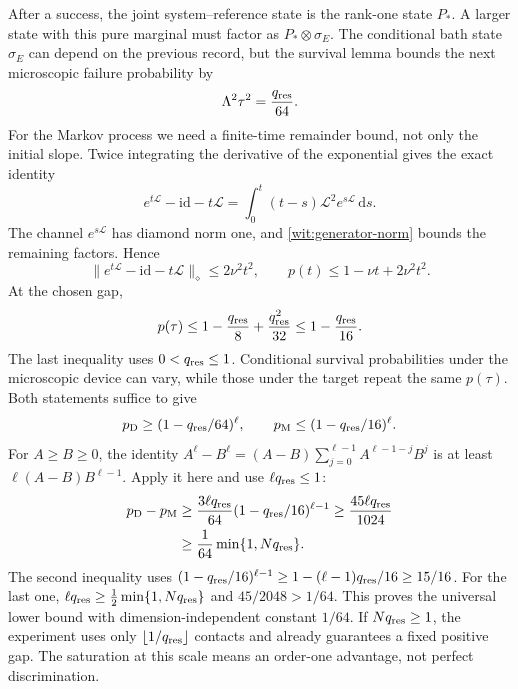 \documentclass[11pt,a4paper]{article}
\numberwithin{equation}{section}
\theoremstyle{remark}
\newcommand{\dd}{\mathrm d}
\begin{document}
After a success, the joint system--reference state is the rank-one
state $P_*$. A larger state with this pure marginal must factor as
$P_*\otimes\sigma_E$. The conditional bath state $\sigma_E$ can depend
on the previous record, but the survival lemma bounds the next
microscopic failure probability by
\begin{equation}
 \Lambda^2\tau^2=\frac{q_{\rm res}}{64}.
\end{equation}
For the Markov process we need a finite-time remainder bound, not only
the initial slope. Twice integrating the derivative of the exponential
gives the exact identity
\begin{equation}
 e^{t\mathcal L}-\mathrm{id}-t\mathcal L
 =\int_0^t(t-s)\mathcal L^2e^{s\mathcal L}\,\dd s.
\end{equation}
The channel $e^{s\mathcal L}$ has diamond norm one, and
\eqref{wit:generator-norm} bounds the remaining factors. Hence
\begin{equation}
 \|e^{t\mathcal L}-\mathrm{id}-t\mathcal L\|_\diamond
 \leq2\nu^2t^2,
 \qquad
 p(t)\leq1-\nu t+2\nu^2t^2.
 \label{wit:taylor-bound}
\end{equation}
At the chosen gap,
\begin{equation}
 p(\tau)\leq1-\frac{q_{\rm res}}8+\frac{q_{\rm res}^2}{32}
 \leq1-\frac{q_{\rm res}}{16}.
\end{equation}
The last inequality uses $0<q_{\rm res}\leq1$. Conditional survival probabilities
under the microscopic device can vary, while those under the target
repeat the same $p(\tau)$. Both statements suffice to give
\begin{equation}
 p_{\mathrm D}\geq(1-q_{\rm res}/64)^\ell,
 \qquad p_{\mathrm M}\leq(1-q_{\rm res}/16)^\ell.
\end{equation}
For $A\geq B\geq0$, the identity
$A^\ell-B^\ell=(A-B)\sum_{j=0}^{\ell-1}A^{\ell-1-j}B^j$
is at least $\ell(A-B)B^{\ell-1}$. Apply it here and use $\ell q_{\rm res}\leq1$:
\begin{align}
 p_{\mathrm D}-p_{\mathrm M}
 &\geq\frac{3\ell q_{\rm res}}{64}(1-q_{\rm res}/16)^{\ell-1}
 \geq\frac{45\ell q_{\rm res}}{1024} \nonumber\\
 &\geq\frac1{64}\min\{1,Nq_{\rm res}\}.
 \label{wit:general-lower}
\end{align}
The second inequality uses
$(1-q_{\rm res}/16)^{\ell-1}\geq1-(\ell-1)q_{\rm res}/16\geq15/16$.
For the last one,
$\ell q_{\rm res}\geq\tfrac12\min\{1,Nq_{\rm res}\}$ and $45/2048>1/64$.
This proves the universal lower bound with dimension-independent
constant $1/64$. If $Nq_{\rm res}\geq1$, the experiment uses only
$\lfloor1/q_{\rm res}\rfloor$ contacts and already guarantees a fixed positive
gap. The saturation at this scale means an order-one advantage, not
perfect discrimination.
\end{document}
